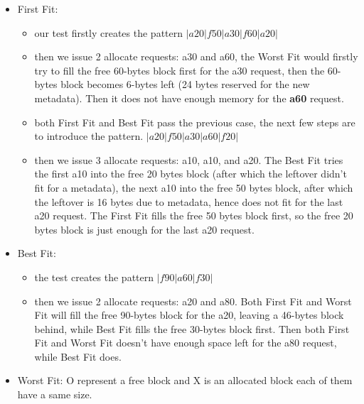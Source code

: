 \documentclass{article}
\begin{document}
\begin{itemize}
\item First Fit:
\begin{itemize}
\item our test firstly creates the pattern
$|a20|f50|a30|f60|a20|$
\item then we issue 2 allocate requests: a30 and a60, the Worst Fit would firstly try to fill the free 60-bytes block first for the a30 request, then the 60-bytes block becomes 6-bytes left (24 bytes reserved for the new metadata). Then it does not have enough memory for the \textbf{a60} request.
\item both First Fit and Best Fit pass the previous case, the next few steps are to introduce the pattern.
$|a20|f50|a30|a60|f20|$
\item then we issue 3 allocate requests: a10, a10, and a20. The Best Fit tries the first a10 into the free 20 bytes block (after which the leftover didn't fit for a metadata), the next a10 into the free 50 bytes block, after which the leftover is 16 bytes due to metadata, hence does not fit for the last a20 request. The First Fit fills the free 50 bytes block first, so the free 20 bytes block is just enough for the last a20 request.
\end{itemize}

\item Best Fit:
\begin{itemize}
\item the test creates the pattern $|f90|a60|f30|$
\item then we issue 2 allocate requests: a20 and a80. Both First Fit and Worst Fit will fill the free 90-bytes block for the a20, leaving a 46-bytes block behind, while Best Fit fills the free 30-bytes block first. Then both First Fit and Worst Fit doesn't have enough space left for the a80 request, while Best Fit does.
\end{itemize}

\item Worst Fit:
O represent a free block and X is an allocated block each of them have a same size.


\end{itemize}
\end{document}
